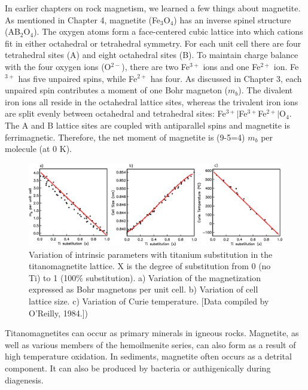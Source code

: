 %
%
In earlier chapters on rock magnetism, we learned a few things about magnetite.  As mentioned in Chapter 4, magnetite (Fe$_3$O$_4$) has an
inverse spinel structure (AB$_2$O$_4$).  The oxygen atoms form a face-centered cubic
lattice into which cations fit in either octahedral or tetrahedral symmetry. 
 For each
unit cell there are four tetrahedral sites (A) and eight octahedral sites (B). 
To maintain charge balance with the four oxygen ions (O$^{2-}$), 
there are two Fe$^{3+}$ ions
and one Fe$^{2+}$ ion. 
Fe$^{3+}$ has five unpaired spins, while Fe$^{2+}$ has four.  As
discussed in Chapter  3, each unpaired spin contributes a moment of one 
% 
Bohr magneton ($m_b$). 
The divalent iron ions all reside in the octahedral lattice
sites, whereas  the trivalent iron ions are split evenly between octahedral and
tetrahedral sites: Fe$^{3+}|$Fe$^{3+}$Fe$^{2+}|$O$_4$.  The A and B lattice sites are
coupled with antiparallel spins and magnetite is ferrimagnetic.
Therefore, the net moment of  magnetite is (9-5=4)  $m_b $ per molecule
(at 0 K).

 \begin{figure}[htb]
\centering  \includegraphics[width=14 cm]{EPSfiles/X.eps}
\caption{Variation of intrinsic parameters with titanium substitution in the titanomagnetite lattice.  X is the degree of substitution from 0 (no Ti) to 1 (100\% substitution).  a) Variation of the magnetization expressed as Bohr magnetons per unit cell.  b) Variation of cell lattice size.  c) Variation of Curie temperature. [Data compiled by O'Reilly, 1984.])}
\label{fig:X}
\end{figure} \nocite{oreilly84}


Titanomagnetites can occur 
as  primary minerals in igneous rocks.  Magnetite, as well as various
members of the hemoilmenite series, can also form as a
result of high temperature 
oxidation.  In sediments, magnetite often occurs as a 
detrital component.  It can
also be produced by bacteria or authigenically during diagenesis.


